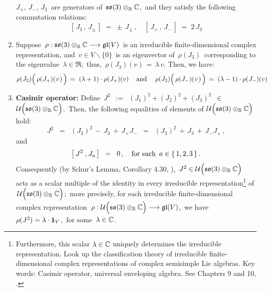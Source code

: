 \begin{proposition}
\begin{enumerate}
	$J_{+},\, J_{-},\, J_{3}$\, are generators of \,$\mathfrak{so}(3) \otimes_{\mathbb{R}} \mathbb{C}$,\, and
	they satisfy the following commutation relations:
	\begin{equation*}
	\left[\,J_{3}\,,\,J_{\pm}\,\right] \;=\; \pm\,J_{\pm}\,,
	\quad
	\left[\,J_{+}\,,\,J_{-}\,\right] \;=\; 2\,J_{3}
	\end{equation*}
\item
	Suppose
	\,$\rho : \mathfrak{so}(3) \otimes_{\mathbb{R}} \mathbb{C} \longrightarrow \mathfrak{gl}(V)$\,
	is an irreducible finite-dimensional complex representation, and
	\,$v \in V \backslash\{0\}$\, is an eigenvector of \,$\rho(J_{3})$\,
	corresponding to the eigenvalue \,$\lambda \in \Re$;\, thus, \,$\rho(J_{3})(v) \,=\, \lambda\,v$.
	Then, we have:
	\begin{equation*}
	\rho(J_{3})\!\left(\,\rho(J_{+})(\overset{{\color{white}-}}{v})\,\right) \, = \; (\lambda+1)\cdot\rho(J_{+})(v)\,
	\quad\textnormal{and}\quad\;
	\rho(J_{3})\!\left(\,\rho(J_{-})(\overset{{\color{white}-}}{v})\,\right) \, = \; (\lambda-1)\cdot\rho(J_{-})(v)
	\end{equation*}
\item
	\textbf{Casimir operator:}\;\;
	Define
	\,$J^{2}$
	\,$:=$\,
	$(J_{1})^{2} + (J_{2})^{2} + (J_{3})^{2}$
	\,$\in$\
	 $\mathcal{U}\!\left(\so(3) \overset{{\color{white}.}}{\otimes_{\Re}} \C\right)$.\,
	Then, the following equalities of elements of
	\;$\mathcal{U}\!\left(\so(3) \overset{{\color{white}.}}{\otimes_{\Re}} \C\right)$
	hold:
	\begin{equation*}
	J^{2}
	\;\; =\;\;
		(J_{3})^{2} \,-\, J_{3} \,+\, J_{+}J_{-}
	\;\; =\;\;
		(J_{3})^{2} \,+\, J_{3} \,+\, J_{-}J_{+}\,,
	\end{equation*}
	and
	\begin{equation*}
	\left[\,J^{2}\,\overset{{\color{white}1}}{,}\,J_{a}\,\right]
	\;\; = \;\;
		0\,,
	\quad
	\textnormal{for each \,$a \in \{\,1,2,3\,\}$}\,.
	\end{equation*}
	Consequently (by Schur's Lemma, Corollary 4.30, \cite{Hall2015}), 
	\,$J^{2} \in \mathcal{U}\!\left(\so(3) \overset{{\color{white}.}}{\otimes_{\Re}} \C\right)$\,
	acts as a scalar multiple of the identity in every irreducible
	representation\footnote{Furthermore, this scalar $\lambda \in \mathbb{C}$ uniquely determines
	the irreducible representation.
	Look up the classification theory of irreducible finite-dimensional complex representations
	of complex semisimple Lie algebras.
	Key words: Casimir operator, universal enveloping algebra. See Chapters 9 and 10, \cite{Hall2015}.}
	of \,$\mathcal{U}\!\left(\so(3) \overset{{\color{white}.}}{\otimes_{\Re}} \C\right)$;\,
	more precisely, for each irreducible finite-dimensional complex representation
	\,$\rho : \mathcal{U}\!\left(\so(3) \overset{{\color{white}.}}{\otimes_{\Re}} \C\right) \longrightarrow \gl(V)$,\,
	we have \,$\rho(J^{2}) = \lambda \cdot \textnormal{\textbf{1}}_{V}$,\,
	for some \,$\lambda \in \mathbb{C}$.
\end{enumerate}
\end{proposition}

